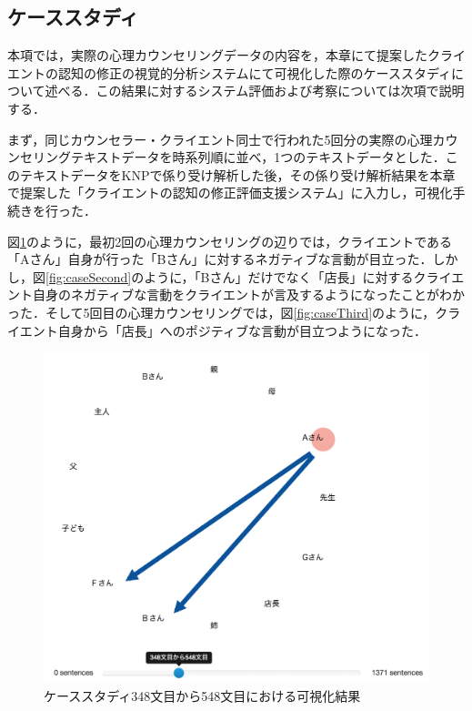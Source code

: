 \documentclass[shuuron]{kuee}
\begin{document}
\subsection{ケーススタディ} %

本項では，実際の心理カウンセリングデータの内容を，本章にて提案したクライエントの認知の修正の視覚的分析システムにて可視化した際のケーススタディについて述べる．この結果に対するシステム評価および考察については次項で説明する．

まず，同じカウンセラー・クライエント同士で行われた5回分の実際の心理カウンセリングテキストデータを時系列順に並べ，1つのテキストデータとした．このテキストデータをKNPで係り受け解析した後，その係り受け解析結果を本章で提案した「クライエントの認知の修正評価支援システム」に入力し，可視化手続きを行った．

図\ref{fig:caseFirst}のように，最初2回の心理カウンセリングの辺りでは，クライエントである「Aさん」自身が行った「Bさん」に対するネガティブな言動が目立った．しかし，図\ref{fig:caseSecond}のように，「Bさん」だけでなく「店長」に対するクライエント自身のネガティブな言動をクライエントが言及するようになったことがわかった．そして5回目の心理カウンセリングでは，図\ref{fig:caseThird}のように，クライエント自身から「店長」へのポジティブな言動が目立つようになった．


\begin{figure}
  \begin{center}
    \includegraphics[width=\linewidth]{caseFirst.png}
  \end{center}
  \caption{ケーススタディ348文目から548文目における可視化結果}
  \label{fig:caseFirst}
\end{figure}
\end{document}
